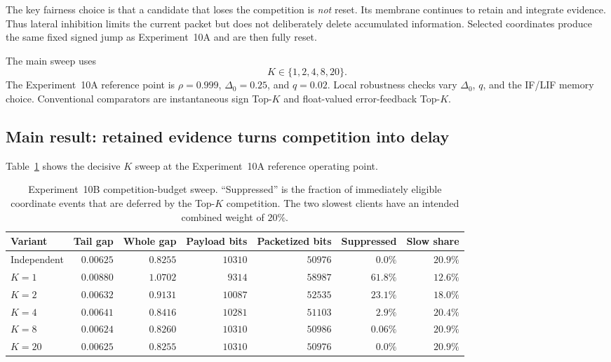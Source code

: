 The key fairness choice is that a candidate that loses the competition is \emph{not} reset. Its membrane continues to retain and integrate evidence. Thus lateral inhibition limits the current packet but does not deliberately delete accumulated information. Selected coordinates produce the same fixed signed jump as Experiment~10A and are then fully reset.

The main sweep uses
\begin{equation}
  K\in\{1,2,4,8,20\}.
\end{equation}
The Experiment~10A reference point is $\rho=0.999$, $\Delta_0=0.25$, and $q=0.02$. Local robustness checks vary $\Delta_0$, $q$, and the IF/LIF memory choice. Conventional comparators are instantaneous sign Top-$K$ and float-valued error-feedback Top-$K$.

\subsection{Main result: retained evidence turns competition into delay}

Table~\ref{tab:exp10b_k} shows the decisive $K$ sweep at the Experiment~10A reference operating point.

\begin{table}[ht]
  \centering
  \small
  \caption{Experiment~10B competition-budget sweep. ``Suppressed'' is the fraction of immediately eligible coordinate events that are deferred by the Top-$K$ competition. The two slowest clients have an intended combined weight of $20\%$.}
  \label{tab:exp10b_k}
  \begin{adjustbox}{max width=\textwidth}
\begin{tabular}{lrrrrrr}
    \toprule
    Variant & Tail gap & Whole gap & Payload bits & Packetized bits & Suppressed & Slow share \\
    \midrule
    Independent & $0.00625$ & $0.8255$ & $10310$ & $50976$ & $0.0\%$ & $20.9\%$ \\
    $K=1$ & $0.00880$ & $1.0702$ & $9314$ & $58987$ & $61.8\%$ & $12.6\%$ \\
    $K=2$ & $0.00632$ & $0.9131$ & $10087$ & $52535$ & $23.1\%$ & $18.0\%$ \\
    $K=4$ & $0.00641$ & $0.8416$ & $10281$ & $51103$ & $2.9\%$ & $20.4\%$ \\
    $K=8$ & $0.00624$ & $0.8260$ & $10310$ & $50986$ & $0.06\%$ & $20.9\%$ \\
    $K=20$ & $0.00625$ & $0.8255$ & $10310$ & $50976$ & $0.0\%$ & $20.9\%$ \\
    \bottomrule
  \end{tabular}
\end{adjustbox}
\end{table}


